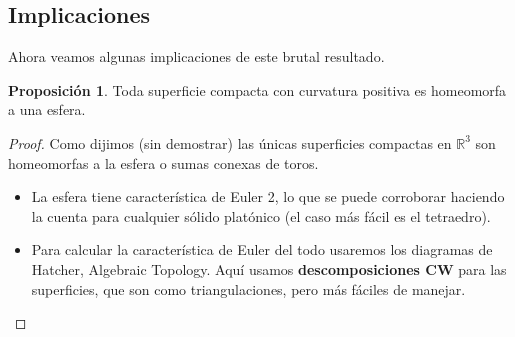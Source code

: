 \documentclass[spanish]{book}
\theoremstyle{definition}
\newtheorem*{prop}{Proposición}
\newcommand{\R}{\mathbb{R}}
\begin{document}
\subsection{Implicaciones}
Ahora veamos algunas implicaciones de este brutal resultado.
\begin{prop}
	Toda superficie compacta con curvatura positiva es homeomorfa a una esfera.
\end{prop}
\begin{proof}
Como dijimos (sin demostrar) las únicas superficies compactas  en $\R^3$ son homeomorfas a la esfera o sumas conexas de toros.
\begin{itemize}
	\item La esfera tiene característica de Euler 2, lo que se puede corroborar haciendo la cuenta para cualquier sólido platónico (el caso más fácil es el tetraedro).
	\item Para calcular la característica de Euler del todo usaremos los diagramas de Hatcher, Algebraic Topology. Aquí usamos \textbf{descomposiciones CW} para las superficies, que son como triangulaciones, pero más fáciles de manejar.
	

\end{itemize}
\end{proof}
\end{document}
